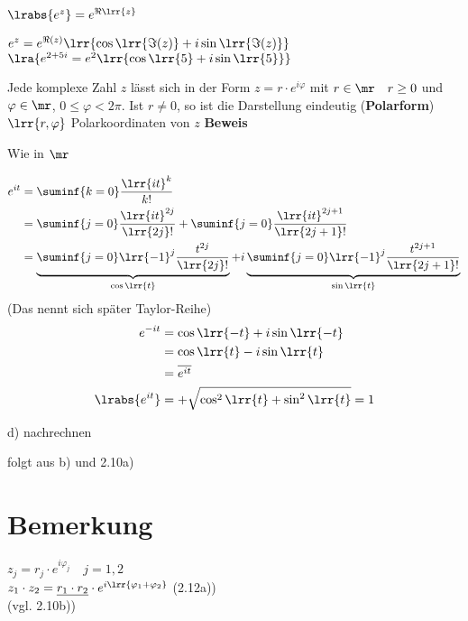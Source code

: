 		\item $\lrabs{e^z}=e^{\Re\lrr{z}}$
		\item $e^z=e^{\Re(z)}\lrr{\cos\lrr{\Im(z)}+i\sin\lrr{\Im(z)}}$\\
			$\lra{e^{2+5i}=e^2\lrr{\cos\lrr{5}+i\sin\lrr{5}}}$
		\item Jede komplexe Zahl $z$ lässt sich in der Form $z=r\cdot e^{i\varphi}$ mit $r\in\mr\quad r\geq 0$ und $\varphi\in\mr$, $0\leq\varphi <2\pi$. Ist $r\neq 0$, so ist die Darstellung eindeutig (\textbf{Polarform})\\
			$\lrr{r,\varphi}$ Polarkoordinaten von $z$
	\subExEnd
	\textbf{Beweis}
		\item Wie in $\mr$
		\item 
			\begin{align*}
				e^{it}&=\suminf{k=0}\frac{\lrr{it}^k}{k!}\\
				&=\suminf{j=0}\frac{\lrr{it}^{2j}}{\lrr{2j}!}+\suminf{j=0}\frac{\lrr{it}^{2j+1}}{\lrr{2j+1}!}\\
				&=\underbrace{\suminf{j=0}\lrr{-1}^j\frac{t^{2j}}{\lrr{2j}!}}_{\cos\lrr{t}}+i\underbrace{\suminf{j=0}\lrr{-1}^j\frac{t^{2j+1}}{\lrr{2j+1}!}}_{\sin\lrr{t}}
			\end{align*}
			(Das nennt sich später Taylor-Reihe)
			\begin{align*}
				e^{-it}&=\cos\lrr{-t}+i\sin\lrr{-t}\\
				&=\cos\lrr{t}-i\sin\lrr{t}\\
				&=\overline{e^{it}}\\
				\lrabs{e^{it}}&=+\sqrt{\cos^2\lrr{t}+\sin^2\lrr{t}}=1
			\end{align*}
		\item d) nachrechnen
		\item folgt aus b) und 2.10a)
	\subExEnd

\section{Bemerkung}
	$z_j=r_j\cdot e^{i\varphi_j}\quad j=1,2$\\
	$z_1\cdot z_2=\underline{r_1\cdot r_2}\cdot e^{i\lrr{\varphi_1+\varphi_2}}$ (2.12a))\\
	(vgl. 2.10b))

